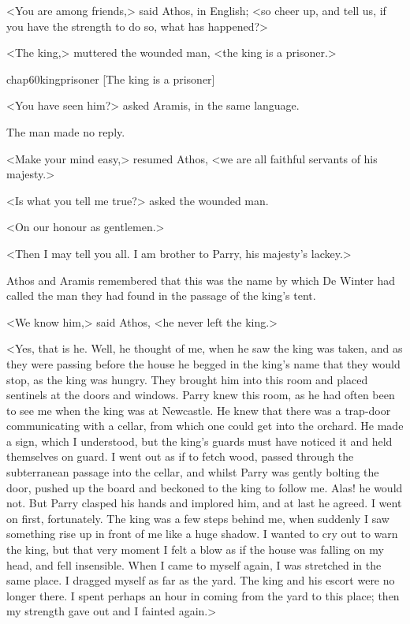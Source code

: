<You are among friends,> said Athos, in English; <so cheer up, and tell us, if you have the strength to do so, what has happened?>

<The king,> muttered the wounded man, <the king is a prisoner.>


\begin{bwbigpic}
	[\basicscale] 
	{chap60kingprisoner}
	[The king is a prisoner]
\end{bwbigpic}

<You have seen him?> asked Aramis, in the same language.

The man made no reply.

<Make your mind easy,> resumed Athos, <we are all faithful servants of his majesty.>

<Is what you tell me true?> asked the wounded man.

<On our honour as gentlemen.>

<Then I may tell you all. I am brother to Parry, his majesty's lackey.>

Athos and Aramis remembered that this was the name by which De Winter had called the man they had found in the passage of the king's tent.

<We know him,> said Athos, <he never left the king.>

<Yes, that is he. Well, he thought of me, when he saw the king was taken, and as they were passing before the house he begged in the king's name that they would stop, as the king was hungry. They brought him into this room and placed sentinels at the doors and windows. Parry knew this room, as he had often been to see me when the king was at Newcastle. He knew that there was a trap-door communicating with a cellar, from which one could get into the orchard. He made a sign, which I understood, but the king's guards must have noticed it and held themselves on guard. I went out as if to fetch wood, passed through the subterranean passage into the cellar, and whilst Parry was gently bolting the door, pushed up the board and beckoned to the king to follow me. Alas! he would not. But Parry clasped his hands and implored him, and at last he agreed. I went on first, fortunately. The king was a few steps behind me, when suddenly I saw something rise up in front of me like a huge shadow. I wanted to cry out to warn the king, but that very moment I felt a blow as if the house was falling on my head, and fell insensible. When I came to myself again, I was stretched in the same place. I dragged myself as far as the yard. The king and his escort were no longer there. I spent perhaps an hour in coming from the yard to this place; then my strength gave out and I fainted again.>

